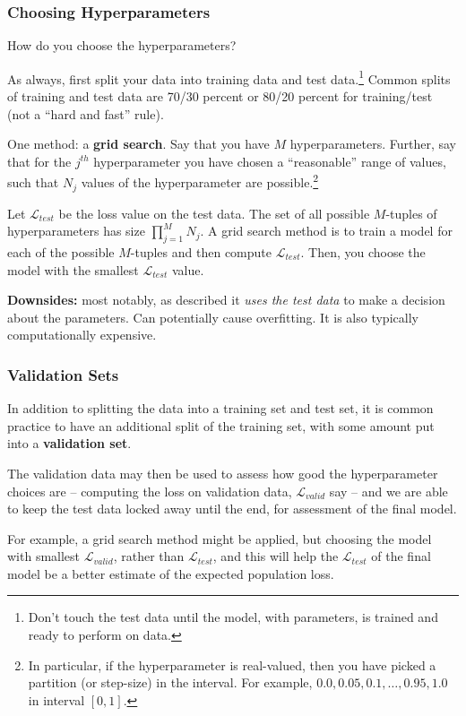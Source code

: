 \documentclass[smaller]{beamer}
\theoremstyle{example}
\begin{document}
\begin{frame}
    \frametitle{Choosing Hyperparameters}
How do you choose the hyperparameters?

\pause
As always, first split your data into training data and test data.\footnote{Don't touch the test data until the model, with parameters, is trained and ready to perform on data.} Common splits of training and test data are 70/30 percent or 80/20 percent for training/test (not a ``hard and fast'' rule).

\pause
One method: a \textbf{grid search}. Say that you have $M$ hyperparameters. Further, say that for the $j^{th}$ hyperparameter you have chosen a ``reasonable'' range of values, such that $N_j$ values of the hyperparameter are possible.\footnote{In particular, if the hyperparameter is real-valued, then you have picked a partition (or step-size) in the interval. For example, $0.0, 0.05, 0.1, \ldots, 0.95, 1.0$ in interval $[0,1]$.}

\pause
Let $\mathcal L_{test}$ be the loss value on the test data. The set of all possible $M$-tuples of hyperparameters has size $\prod_{j=1}^M N_j$. A grid search method is to train a model for each of the possible $M$-tuples and then compute $\mathcal L_{test}$. Then, you choose the model with the smallest $\mathcal L_{test}$ value.

\pause
\textbf{Downsides:} most notably, as described it \textit{uses the test data} to make a decision about the parameters. Can potentially cause overfitting. \newline 
It is also typically computationally expensive.
\end{frame}

\begin{frame}
    \frametitle{Validation Sets}
In addition to splitting the data into a training set and test set, it is common practice to have an additional split of the training set, with some amount put into a \textbf{validation set}. 

\pause
The validation data may then be used to assess how good the hyperparameter choices are {--} computing the loss on validation data, $\mathcal L_{valid}$ say {--} and we are able to keep the test data locked away until the end, for assessment of the final model.

\pause
For example, a grid search method might be applied, but choosing the model with smallest $\mathcal L_{valid}$, rather than $\mathcal L_{test}$, and this will help the $\mathcal L_{test}$ of the final model be a better estimate of the expected population loss.
\end{frame}
\end{document}

